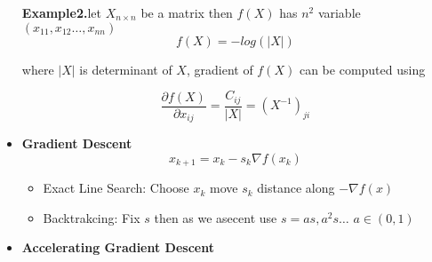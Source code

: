 \documentclass[a4paper]{article}
\numberwithin{equation}{section}
\begin{document}
\begin{itemize}
\textbf{Example2.}let $X_{n\times n}$ be a matrix then $f(X)$ has $n^2$ variable $(x_{11},x_{12}\dots ,x_{nn})$
\[\boxed{f(X)=-log(\vert X \vert)}\]

where $\vert X \vert$ is determinant of $X$, gradient of $f(X)$ can be computed using

\[\frac{\partial f(X)}{\partial x_{ij}}=\frac{C_{ij}}{\vert X\vert}=(X^{-1})_{ji}\]

\item \textbf{Gradient Descent}
\[\boxed{x_{k+1}=x_k-s_k \nabla f(x_k)}\]
\begin{itemize}
    \item Exact Line Search: Choose $x_k$ move $s_k$ distance along $-\nabla f(x)$
    \item Backtrakcing: Fix $s$ then as we asecent use $s=as,a^2s\dots$ $a\in(0,1)$
\end{itemize}

\item \textbf{Accelerating Gradient Descent}


\end{itemize}
\end{document}
